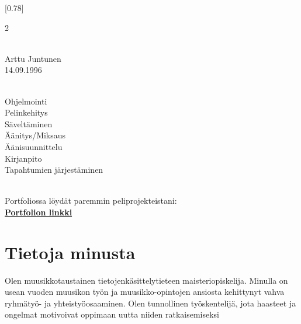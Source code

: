 \documentclass[lighthipster]{simplehipstercv}
\begin{document}
\setlength{\columnsep}{1cm}
[0.78]
\begin{paracol}{2}

\paracolbackgroundoptions



\footnotesize
{\setasidefontcolour
\flushright

\vspace*{5em}


 \\[0.5em]
Arttu Juntunen \\
14.09.1996

\bigskip

 \\[0.5em]

Ohjelmointi \\
Pelinkehitys \\
Säveltäminen \\
Äänitys/Miksaus \\
Äänisuunnittelu \\
Kirjanpito \\
Tapahtumien järjestäminen\\

\bigskip

 \\[0.5em]
Portfoliossa löydät paremmin peliprojekteistani: \\
\vspace{0.1em}
\href{https://arttujun.my.canva.site/}{\textbf{Portfolion linkki}}

\vspace{\fill}


\phantom{turn the page}

\phantom{turn the page}
}
\switchcolumn

\small

\section*{Tietoja minusta}
Olen muusikkotaustainen tietojenkäsittelytieteen maisteriopiskelija. Minulla on usean vuoden muusikon työn ja muusikko-opintojen ansiosta kehittynyt vahva ryhmätyö- ja yhteistyöosaaminen. Olen tunnollinen työskentelijä, jota haasteet ja ongelmat motivoivat oppimaan uutta niiden ratkaisemiseksi


\end{paracol}
\end{document}
